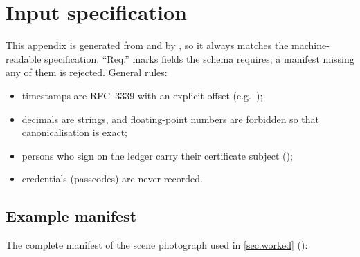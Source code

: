 \section{Input specification}
\label{app:spec}

This appendix is generated from  and  by , so it always matches the machine-readable specification. \enquote{Req.} marks fields the schema requires; a manifest missing any of them is rejected. General rules:
\begin{itemize}[nosep]
  \item timestamps are RFC~3339 with an explicit offset (e.g.\ );
  \item decimals are strings, and floating-point numbers are forbidden so that canonicalisation is exact;
  \item persons who sign on the ledger carry their certificate subject ();
  \item credentials (passcodes) are never recorded.
\end{itemize}

{\small

}

\subsection{Example manifest}
The complete manifest of the scene photograph used in \cref{sec:worked} ():

